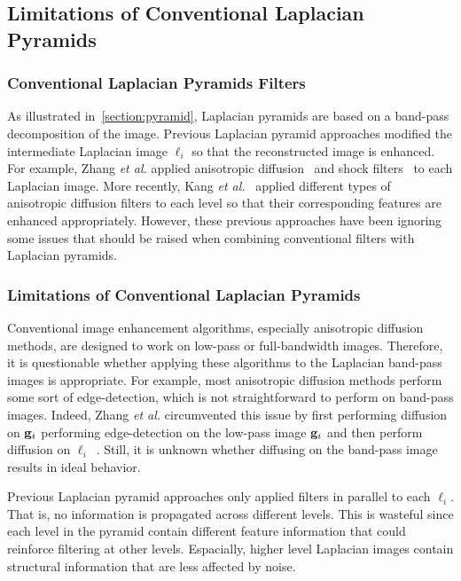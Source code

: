 \subsection{Limitations of Conventional Laplacian Pyramids}\label{section:limitations}
\subsubsection{Conventional Laplacian Pyramids Filters}
As illustrated in~\cref{section:pyramid}, Laplacian pyramids are based on a band-pass decomposition of the image.
Previous Laplacian pyramid approaches modified the intermediate Laplacian image \({\boldsymbol\ell_i}\) so that the reconstructed image is enhanced.
For example, Zhang \textit{et al.} applied anisotropic diffusion~\cite{perona_scalespace_1990} and shock filters~\cite{zhang_multiscale_2006} to each Laplacian image.
More recently, Kang \textit{et al.}~\cite{kang_new_2016} applied different types of anisotropic diffusion filters to each level so that their corresponding features are enhanced appropriately.
However, these previous approaches have been ignoring some issues that should be raised when combining conventional filters with Laplacian pyramids.

\subsubsection{Limitations of Conventional Laplacian Pyramids}
Conventional image enhancement algorithms, especially anisotropic diffusion methods, are designed to work on low-pass or full-bandwidth images.
Therefore, it is questionable whether applying these algorithms to the Laplacian band-pass images is appropriate.
For example, most anisotropic diffusion methods perform some sort of edge-detection, which is not straightforward to perform on band-pass images.
Indeed, Zhang \textit{et al.} circumvented this issue by first performing diffusion on \(\mathbf{g}_{i}\)
performing edge-detection on the low-pass image \(\mathbf{g}_{i}\) and then perform diffusion on \({\boldsymbol\ell}_{i}\)~\cite{zhang_multiscale_2006}.
Still, it is unknown whether diffusing on the band-pass image results in ideal behavior.

Previous Laplacian pyramid approaches only applied filters in parallel to each \({\boldsymbol\ell}_i\).
That is, no information is propagated across different levels.
This is wasteful since each level in the pyramid contain different feature information that could reinforce filtering at other levels.
Espacially, higher level Laplacian images contain structural information that are less affected by noise.

